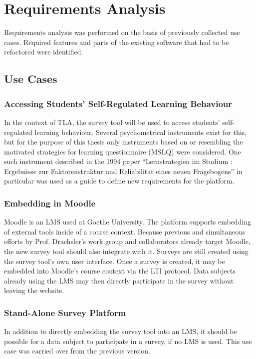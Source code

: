 \section{Requirements Analysis}
Requirements analysis was performed on the basis of previously collected use cases.
Required features and parts of the existing software that
had to be refactored were identified.

\subsection{Use Cases}

    \subsubsection{Accessing Students' Self-Regulated Learning Behaviour}
    In the context of TLA, the survey tool will be used to access students' self-regulated
    learning behaviour. Several psychometrical instruments exist for this, but
    for the purpose of this thesis only instruments based on or resembling
    the motivated strategies for learning questionnaire (MSLQ) were considered.
    One such instrument described in the 1994 paper 
    ``Lernstrategien im Studium : Ergebnisse zur Faktorenstruktur und Reliabilitat eines neuen Fragebogens'' \cite{lernstrategien-wild-schiefele}
    in particular was used as a guide to define new requirements for the platform.
     
     \subsubsection{Embedding in Moodle}
     \label{use-case:embedding}
     Moodle is an LMS used at Goethe University. The platform supports embedding of external
     tools inside of a course context. Because previous and simultaneous efforts by Prof. Drachsler's
     work group and collaborators already target Moodle, the new survey tool should also integrate
     with it. Surveys are still created using the survey tool's own user interface.
     Once a survey is created, it may be embedded into Moodle's course context via the LTI
     protocol. Data subjects already using the LMS may then directly participate in
     the survey without leaving the website.
 
     \subsubsection{Stand-Alone Survey Platform}
     In addition to directly embedding the survey tool into an LMS, it should be possible
     for a data subject to participate in a survey, if no LMS is used.
     This use case was carried over from the previous version.

